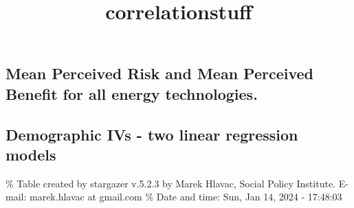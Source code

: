 \documentclass[
]{article}
\title{correlationstuff}
\author{}
\date{\vspace{-2.5em}}
\begin{document}
\maketitle

{
\setcounter{tocdepth}{2}
\tableofcontents
}
\newpage

\hypertarget{mean-perceived-risk-and-mean-perceived-benefit-for-all-energy-technologies.}{%
\subsection{Mean Perceived Risk and Mean Perceived Benefit for all
energy
technologies.}\label{mean-perceived-risk-and-mean-perceived-benefit-for-all-energy-technologies.}}

\newpage

\hypertarget{demographic-ivs---two-linear-regression-models}{%
\subsection{Demographic IVs - two linear regression
models}\label{demographic-ivs---two-linear-regression-models}}

\begingroup\setlength{\tabcolsep}{1pt}\renewcommand{\arraystretch}{0.7}

\% Table created by stargazer v.5.2.3 by Marek Hlavac, Social Policy
Institute. E-mail: marek.hlavac at gmail.com \% Date and time: Sun, Jan
14, 2024 - 17:48:03
\end{document}
